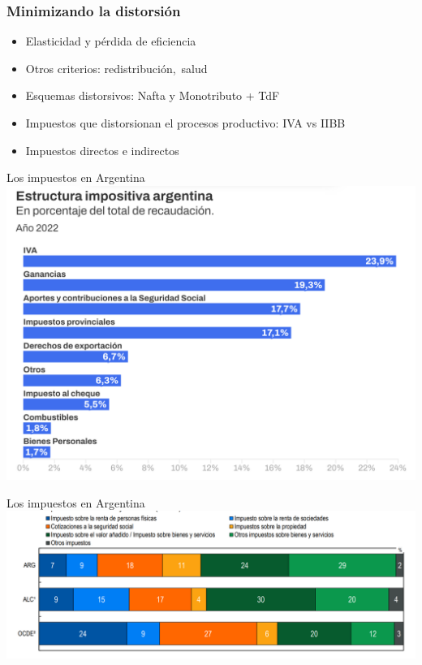 \documentclass{beamer}
\begin{document}
\begin{frame}
\frametitle{Minimizando la distorsión}
\begin{itemize}
    \item Elasticidad y pérdida de eficiencia 
    \item Otros criterios: redistribución, salud
    \item Esquemas distorsivos: Nafta y Monotributo + TdF
    \item Impuestos que distorsionan el procesos productivo: IVA vs IIBB
    \item Impuestos directos e indirectos
\end{itemize}
\end{frame}

\begin{frame}{Los impuestos en Argentina}
\centering
 \includegraphics[scale=0.6]{../Figures/Impositiva.png}   
\end{frame}

\begin{frame}{Los impuestos en Argentina}
\centering
 \includegraphics[scale=0.6]{../Figures/Impositiva II.png}   
\end{frame}
\end{document}
